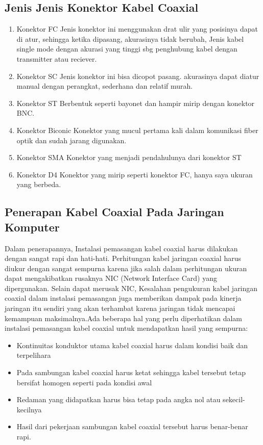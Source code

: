 	\subsection{Jenis Jenis Konektor Kabel Coaxial}
		\begin{enumerate}
			\item Konektor FC
			Jenis konektor ini menggunakan drat ulir yang posisinya dapat di atur, sehingga ketika dipasang, akurasinya tidak berubah, Jenis kabel single mode dengan akurasi yang tinggi sbg penghubung kabel dengan transmitter atau reciever.
			\item Konektor SC
			Jenis konektor ini bisa dicopot pasang. akurasinya dapat diatur manual dengan perangkat, sederhana dan relatif murah.
			\item Konektor ST
			Berbentuk seperti bayonet dan hampir mirip dengan konektor BNC.
			\item Konektor Biconic
			Konektor yang mucul pertama kali dalam komunikasi fiber optik dan sudah jarang digunakan.
			\item Konektor SMA
			Konektor yang menjadi pendahulunya dari konektor ST
			\item Konektor D4
			Konektor yang mirip seperti konektor FC, hanya saya ukuran yang berbeda.
		\end{enumerate}
	\subsection {Penerapan Kabel Coaxial Pada Jaringan Komputer}
	Dalam penerapannya, Instalasi pemasangan kabel coaxial harus dilakukan dengan sangat rapi dan hati-hati. Perhitungan kabel jaringan coaxial harus diukur dengan sangat sempurna karena jika salah dalam perhitungan ukuran dapat mengakibatkan rusaknya NIC (Network Interface Card) yang dipergunakan. Selain dapat merusak NIC, Kesalahan pengukuran kabel jaringan coaxial dalam instalasi pemasangan juga memberikan dampak pada kinerja jaringan itu sendiri yang akan terhambat karena jaringan tidak mencapai kemampuan maksimalnya.Ada beberapa hal yang perlu diperhatikan dalam instalasi pemasangan kabel coaxial untuk mendapatkan hasil yang sempurna:
		\begin{itemize}
			\item Kontinuitas konduktor utama kabel coaxial harus dalam kondisi baik dan terpelihara
			\item Pada sambungan kabel coaxial harus ketat sehingga kabel tersebut tetap bersifat homogen seperti pada kondisi awal
			\item Redaman yang didapatkan harus bisa tetap pada angka nol atau sekecil-kecilnya
			\item Hasil dari pekerjaan sambungan kabel coaxial tersebut harus benar-benar rapi.
		\end{itemize}
		
